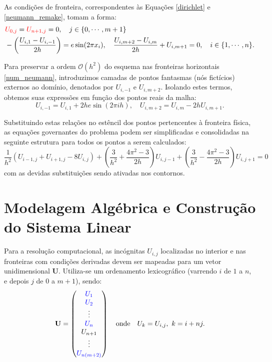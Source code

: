 \documentclass[12pt, a4paper]{article}
\begin{document}
    As condições de fronteira, correspondentes às Equações \eqref{dirichlet} e \eqref{neumann_remake}, tomam a forma:
    \begin{align}
        &{\color{red}U_{0,j}} = {\color{red}U_{n+1,j}} = 0, \quad j \in \{0,\cdots,m+1\} \label{num_dirichlet}\\
        &-\left(\frac{U_{i,1}-U_{i,-1}}{2h}\right) = e \sin(2\pi x_i),\quad \frac{U_{i,m+2}-U_{i,m}}{2h} + U_{i,m+1} = 0, \quad i \in \{1,\cdots,n\}. \label{num_neumann}
    \end{align}

    Para preservar a ordem $\mathcal{O}(h^2)$ do esquema nas fronteiras horizontais \eqref{num_neumann}, introduzimos camadas de pontos fantasmas (nós fictícios) externos ao domínio, denotados por $U_{i,-1}$ e $U_{i,m+2}$. Isolando estes termos, obtemos suas expressões em função dos pontos reais da malha:
    \begin{equation}
        U_{i, -1} = U_{i, 1} + 2he\sin(2\pi ih),\quad U_{i,m+2} = U_{i,m} - 2h U_{i,m+1}. \label{simp_neumann}
    \end{equation}

    Substituindo estas relações no estêncil dos pontos pertencentes à fronteira física, as equações governantes do problema podem ser simplificadas e consolidadas na seguinte estrutura para todos os pontos a serem calculados:
    \begin{equation}
        \frac{1}{h^2}(U_{i-1,j} + U_{i+1,j} - 8 U_{i,j}) + \left(\frac{3}{h^2} + \frac{4\pi^2 -3}{2h}\right)U_{i,j-1} + \left(\frac{3}{h^2} - \frac{4\pi^2 -3}{2h}\right) U_{i,j+1} = 0 \label{simp_eq}
    \end{equation}
    com as devidas substituições sendo ativadas nos contornos.


    \section{Modelagem Algébrica e Construção do Sistema Linear}

    Para a resolução computacional, as incógnitas $U_{i,j}$ localizadas no interior e nas fronteiras com condições derivadas devem ser mapeadas para um vetor unidimensional $\mathbf{U}$. Utiliza-se um ordenamento lexicográfico (varrendo $i$ de $1$ a $n$, e depois $j$ de $0$ a $m+1$), sendo:
    \[\mathbf{U} = \begin{pmatrix}
        \color{blue}U_1\\
        \color{blue}U_2\\
        \vdots\\
        \color{blue}U_n\\
        U_{n+1}\\
        \vdots\\
        \color{blue}U_{n(m+2)}
    \end{pmatrix} \quad \text{onde} \quad U_k = U_{i,j},\ k = i + nj.\]
\end{document}
